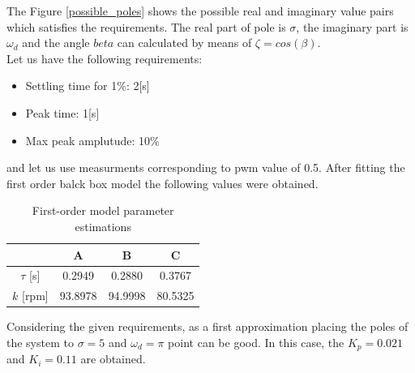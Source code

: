\documentclass[12pt,english]{article}
\begin{document}
The Figure \ref{possible_poles} shows the possible real and imaginary value pairs which satisfies the requirements. The real part of pole is $\sigma$, the imaginary part is $\omega_d$ and the angle $beta$ can calculated by means of $\zeta = cos(\beta)$. \\[2mm]
\noindent Let us have the following requirements:
\begin{itemize}
	\item Settling time for 1$\%$: 2[s]
	\item Peak time: 1[s]
	\item Max peak amplutude: 10\%
\end{itemize}
\noindent and let us use measurments corresponding to pwm value of 0.5. After fitting the first order balck box model the following values were obtained.
\begin{table}[h]
	\centering
	\label{first_order_model_table_50}
	\begin{tabular}{cccc}
		\hline
		& A  		& B  		& C   		\\ \hline
		$\tau$ {[}s{]} 		& 0.2949 	& 0.2880 	& 0.3767 	 \\
		$k$ {[}rpm{]}       & 93.8978 	& 94.9998 	& 80.5325   	\\ \hline
	\end{tabular}
	\caption{First-order model parameter estimations}
\end{table}
Considering the given requirements, as a first approximation placing the poles of the system to $\sigma = 5$ and $\omega_d = \pi$ point can be good.
In this case, the $K_p = 0.021$ and $K_i = 0.11$ are obtained.
\end{document}
